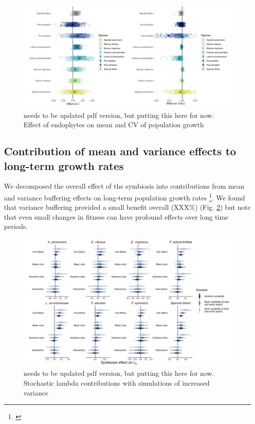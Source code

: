 \documentclass[9pt,twocolumn,twoside,lineno]{pnas-new}\usepackage[]{graphicx}\usepackage[]{xcolor}
\newcommand{\josh}[2]{{\color{green}{#1}}\footnote{\textit{\color{green}{#2}}}}
\begin{document}
\begin{figure}%
\centering
\includegraphics[width=.8\linewidth]{endo_lambdaeffects_plot}
\caption{needs to be updated pdf version, but putting this here for now. Effect of endophytes on mean and CV of population growth}
\label{fig:lambda_figure}
\end{figure}

\subsection*{Contribution of mean and variance effects to long-term growth rates}
We decomposed the overall effect of the symbiosis into contributions from mean and variance buffering effects on long-term population growth rates \josh{\citep{rees2009integral}}{I don't know if there's a better citation for this, this is more about IPM's}. We found that variance buffering provided a small benefit overall (XXX\%) (Fig. \ref{fig:contributions_plot}) but note that even small changes in fitness can have profound effects over long time periods.

\begin{figure}%
\centering
\includegraphics[width=.8\linewidth]{contributions_obs_plot}
\caption{needs to be updated pdf version, but putting this here for now. Stochastic lambda contributions with simulations of increased variance}
\label{fig:contributions_plot}
\end{figure}
\end{document}
